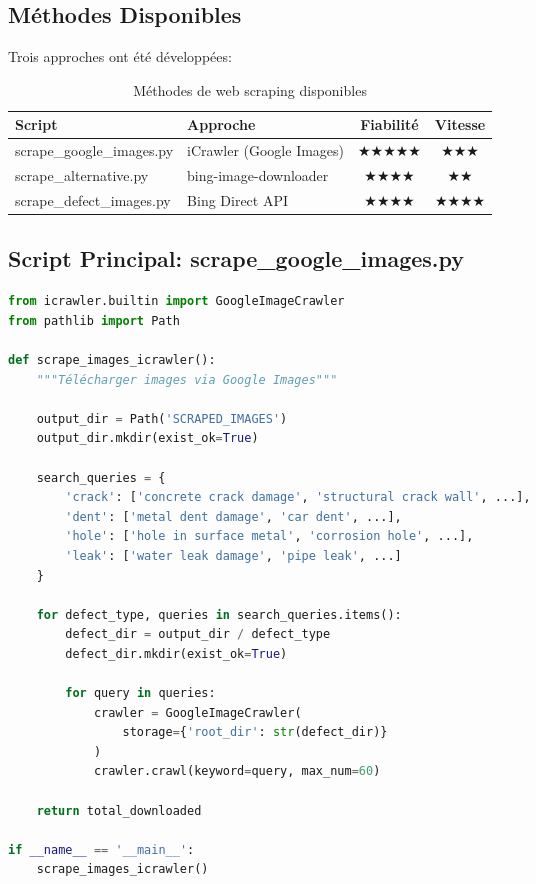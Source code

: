 \documentclass[a4paper,12pt]{report}
\begin{document}
\subsection{Méthodes Disponibles}

Trois approches ont été développées:

\begin{table}[H]
    \centering
    \begin{tabular}{|l|l|c|c|}
    \hline
    \textbf{Script} & \textbf{Approche} & \textbf{Fiabilité} & \textbf{Vitesse} \\
    \hline
    scrape\_google\_images.py & iCrawler (Google Images) & ★★★★★ & ★★★ \\
    \hline
    scrape\_alternative.py & bing-image-downloader & ★★★★ & ★★ \\
    \hline
    scrape\_defect\_images.py & Bing Direct API & ★★★★ & ★★★★ \\
    \hline
    \end{tabular}
    \caption{Méthodes de web scraping disponibles}
\end{table}

\subsection{Script Principal: scrape\_google\_images.py}

\begin{lstlisting}[language=Python]
from icrawler.builtin import GoogleImageCrawler
from pathlib import Path

def scrape_images_icrawler():
    """Télécharger images via Google Images"""
    
    output_dir = Path('SCRAPED_IMAGES')
    output_dir.mkdir(exist_ok=True)
    
    search_queries = {
        'crack': ['concrete crack damage', 'structural crack wall', ...],
        'dent': ['metal dent damage', 'car dent', ...],
        'hole': ['hole in surface metal', 'corrosion hole', ...],
        'leak': ['water leak damage', 'pipe leak', ...]
    }
    
    for defect_type, queries in search_queries.items():
        defect_dir = output_dir / defect_type
        defect_dir.mkdir(exist_ok=True)
        
        for query in queries:
            crawler = GoogleImageCrawler(
                storage={'root_dir': str(defect_dir)}
            )
            crawler.crawl(keyword=query, max_num=60)
    
    return total_downloaded

if __name__ == '__main__':
    scrape_images_icrawler()
\end{lstlisting}
\end{document}
